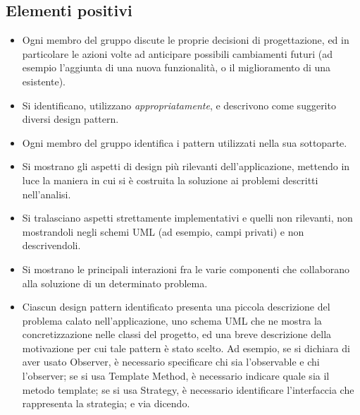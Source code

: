 \subsection*{Elementi positivi}

\begin{itemize}
	\item Ogni membro del gruppo discute le proprie decisioni di progettazione, ed in particolare le azioni volte ad anticipare possibili cambiamenti futuri (ad esempio l'aggiunta di una nuova funzionalità, o il miglioramento di una esistente).
	\item Si identificano, utilizzano \textit{appropriatamente}, e descrivono come suggerito diversi design pattern.
	\item Ogni membro del gruppo identifica i pattern utilizzati nella sua sottoparte.
	\item Si mostrano gli aspetti di design più rilevanti dell'applicazione, mettendo in luce la maniera in cui si è costruita la soluzione ai problemi descritti nell'analisi.
	\item Si tralasciano aspetti strettamente implementativi e quelli non rilevanti, non mostrandoli negli schemi UML (ad esempio, campi privati) e non descrivendoli.
	\item Si mostrano le principali interazioni fra le varie componenti che collaborano alla soluzione di un determinato problema.
	\item Ciascun design pattern identificato presenta una piccola descrizione del problema calato
	nell'applicazione, uno schema UML che ne mostra la concretizzazione nelle classi del progetto, ed
	una breve descrizione della motivazione per cui tale pattern è stato scelto. Ad esempio, se si
	dichiara di aver usato Observer, è necessario specificare chi sia l'observable e chi l'observer; se
	si usa Template Method, è necessario indicare quale sia il metodo template; se si usa Strategy, è
	necessario identificare l'interfaccia che rappresenta la strategia; e via dicendo.
\end{itemize}

